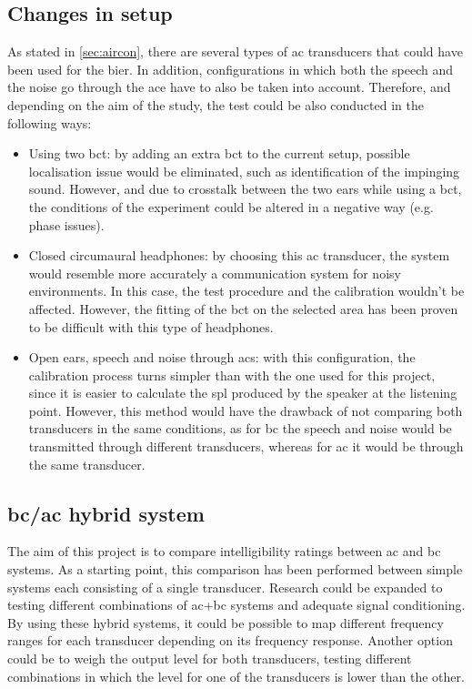 \subsection*{Changes in setup}
As stated in \autoref{sec:aircon}, there are several types of \gls{ac} transducers that could have been used for the \gls{bier}. In addition, configurations in which both the speech and the noise go through the \gls{ace} have to also be taken into account. Therefore, and depending on the aim of the study, the test could be also conducted in the following ways:
\begin{itemize}
\item Using two \gls{bct}: by adding an extra \gls{bct} to the current setup, possible localisation issue would be eliminated, such as identification of the impinging sound. However, and due to crosstalk between the two ears while using a \gls{bct}, the conditions of the experiment could be altered in a negative way (e.g. phase issues).
\item Closed circumaural headphones: by choosing this \gls{ac} transducer, the system would resemble more accurately a communication system for noisy environments. In this case, the test procedure and the calibration wouldn't be affected. However, the fitting of the \gls{bct} on the selected area has been proven to be difficult with this type of headphones.
\item Open ears, speech and noise through \gls{acs}: with this configuration, the calibration process turns simpler than with the one used for this project, since it is easier to calculate the \gls{spl} produced by the speaker at the listening point. However, this method would have the drawback of not comparing both transducers in the same conditions, as for \gls{bc} the speech and noise would be transmitted through different transducers, whereas for \gls{ac} it would be through the same transducer.
\end{itemize}

\subsection*{\gls{bc}/\gls{ac} hybrid system}
The aim of this project is to compare intelligibility ratings between \gls{ac}
and \gls{bc} systems. As a starting point, this comparison has been performed between simple systems each consisting of a single transducer. 
Research could be expanded to testing different combinations of \gls{ac}+\gls{bc} systems and adequate signal conditioning.
By using these hybrid systems, it could be possible to map different frequency ranges for each transducer depending on its frequency response. Another option could be to weigh the output level for both transducers, testing different combinations in which the level for one of the transducers is lower than the other. 
